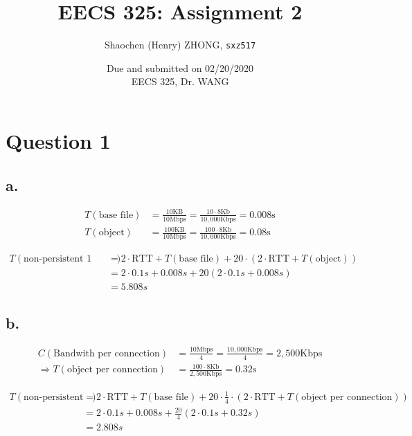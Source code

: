 \documentclass[12pt]{article}
\newcommand{\ilc}{\texttt}
\begin{document}
\title{\textbf{EECS 325: Assignment 2}}

\author{Shaochen (Henry) ZHONG, \ilc{sxz517} }
\date{Due and submitted on 02/20/2020 \\ EECS 325, Dr. WANG}
\maketitle

\section{Question 1}

\subsection{a.}

\begin{align*}
    T(\text{base file}) &= \frac{10 \text{KB}}{10 \text{Mbps}} = \frac{10 \cdot 8 \text{Kb}}{10,000 \text{Kbps}} = 0.008 \text{s} \\
    T(\text{object}) &= \frac{100 \text{KB}}{10 \text{Mbps}} = \frac{100 \cdot 8 \text{Kb}}{10,000 \text{Kbps}} = 0.08 \text{s}
\end{align*}


\begin{align*}
    T(\text{non-persistent 1 TCP}) &= 2 \cdot \text{RTT} + T(\text{base file}) + 20 \cdot (2 \cdot \text{RTT} + T(\text{object})) \\
    &= 2 \cdot 0.1s + 0.008s + 20 (2 \cdot 0.1s + 0.008s) \\
    &= 5.808s
\end{align*}


\subsection{b.}


\begin{align*}
    C(\text{Bandwith per connection}) &= \frac{10 \text{Mbps}}{4} = \frac{10,000 \text{Kbps}}{4} = 2,500 \text{Kbps} \\
    \Longrightarrow T(\text{object per connection}) &= \frac{100 \cdot 8 \text{Kb}}{2,500 \text{Kbps}} = 0.32 \text{s}
\end{align*}

\begin{align*}
    T(\text{non-persistent 4 TCP}) &= 2 \cdot \text{RTT} + T(\text{base file}) + 20 \cdot \frac{1}{4} \cdot (2 \cdot \text{RTT} + T(\text{object per connection})) \\
    &= 2 \cdot 0.1s + 0.008s + \frac{20}{4} (2 \cdot 0.1s + 0.32s) \\
    &= 2.808s
\end{align*}
\end{document}
